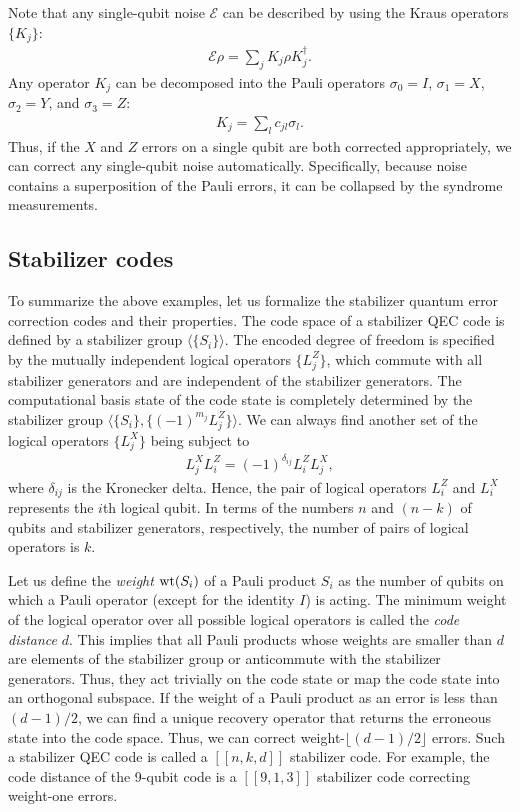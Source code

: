 Note that any single-qubit noise $\mathcal{E}$ can be described by using the Kraus operators $\{ K_j \}$:
\begin{eqnarray}
\mathcal{E} \rho = \sum _j K_j \rho K_j^{\dag}.
\end{eqnarray}
Any operator $K_j$ can be decomposed into the Pauli operators $\sigma _0 = I$, $\sigma _1=X$, $\sigma _2 = Y$, and $\sigma _3 =Z$:
\begin{eqnarray}
K_j = \sum _{l} c_{jl} \sigma _l.
\end{eqnarray}
Thus, if the $X$ and $Z$ errors on a single qubit are both corrected appropriately, we can correct any single-qubit noise automatically.
Specifically, because noise contains a superposition of the Pauli errors, it can be collapsed by the syndrome measurements.


\subsection*{Stabilizer codes}
To summarize the above examples, let us formalize the stabilizer quantum error correction codes and their properties. 
The code space of a stabilizer QEC code is defined by a stabilizer group $\langle \{ S_i \}\rangle$.
The encoded degree of freedom is specified by the mutually independent logical operators $\{L^{Z}_j\}$, which commute with all stabilizer generators and are independent of the stabilizer generators.
The computational basis state of the code state is completely determined by the stabilizer group $\langle \{ S_i\}, \{(-1)^{m_j} L^{Z}_j \} \rangle$.
We can always find another set of the logical operators $\{L^{X}_j\}$ being subject to
\begin{eqnarray}
L^X_j L^Z_i = (-1)^{\delta _{ij}} L^Z_i L^X_j ,
\end{eqnarray}
where $\delta _{ij}$ is the Kronecker delta.
Hence, the pair of logical operators $L_i^{Z}$ and $L_i^{X}$ represents the $i$th logical qubit.
In terms of the numbers $n$ and $(n-k)$ of qubits and stabilizer generators, respectively, the number of pairs of logical operators is $k$. 

Let us define the {\it weight} ${\rm wt}(S_i)$ of a Pauli product $S_i$ as the number of qubits on which a Pauli operator (except for the identity $I$) is acting. 
The minimum weight of the logical operator over all possible logical operators is called the {\it code distance} $d$. 
This implies that all Pauli products whose weights are smaller than $d$ are elements of the stabilizer group or anticommute with the stabilizer generators.
Thus, they act trivially on the code state	 or 
map the code state into an orthogonal subspace.
If the weight of a Pauli product as an error is less than $(d-1)/2$, we can find a unique recovery operator that returns the erroneous state into the code space.
Thus, we can correct weight-$\lfloor (d-1)/2 \rfloor$ errors.
Such a stabilizer QEC code is called a $[[n,k,d]]$ stabilizer code.
For example, the code distance of the 9-qubit code is a $[[9,1,3]]$ stabilizer code correcting weight-one errors.

